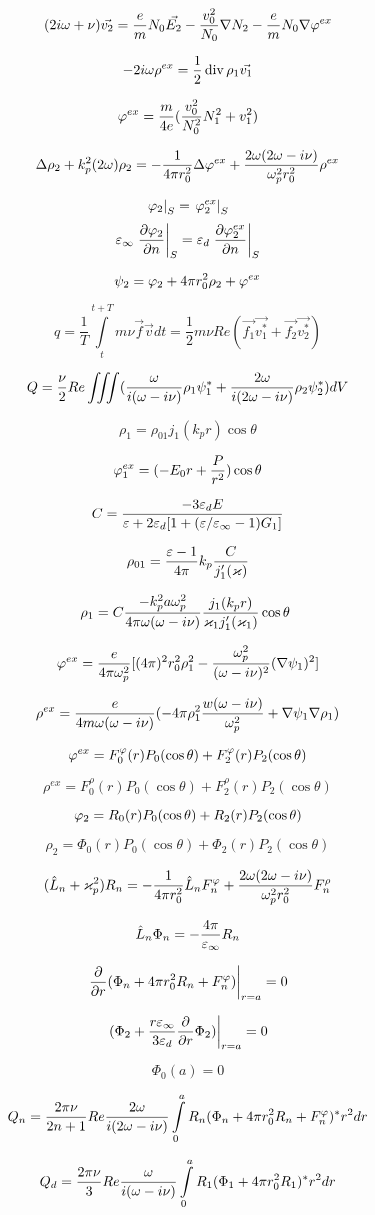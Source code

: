 \documentclass{article}
\begin{document}
\[ (2i\omega + \nu) \vec{v_2} = \frac{e}{m}N_0\vec{E_2} - \frac{v_0^2}{N_0} \nabla N_2 - \frac{e}{m} N_0 \nabla \varphi^{ex}  \]

\[ - 2i\omega \rho^{ex} = \frac{1}{2}\operatorname{div} \rho_1 \vec{v_1}\]

\[ \varphi^{ex} = \frac{m}{4e}(\frac{v_0^2}{N_0^2}N_1^2 + v_1^2)\]

\[ \Delta \rho_2 + k_p^2(2\omega)\rho_2 = -\frac{1}{4 \pi r_0^2} \Delta \varphi^{ex} + \frac{2\omega(2\omega - i \nu)}{\omega_p^2r_0^2} \rho^{ex}\]

\[ \left. \varphi_2 \right|_{ S} = \left. \varphi_2^{ex} \right|_{ S} \]
\[ \varepsilon_\infty \left.\frac{\partial \varphi_2}{\partial n}\right|_{ S} = \varepsilon_d \left.\frac{\partial \varphi_2^{ex}}{\partial n}\right|_{ S}  \]



\[ \psi_2 = \varphi_2 + 4 \pi r_0^2 \rho_2 + \varphi^{ex}\]

\[ q = \frac{1}{T} \int\limits_t^{t+T} m \nu \vec{f} \vec{v} dt = \frac{1}{2} m \nu Re(\vec{f_1} \vec{v_1^*} +\vec{f_2} \vec{v_2^*})\]

\[ Q = \frac{\nu}{2} Re \iiint (\frac{\omega}{i(\omega - i \nu)}\rho_1 \psi_1^* + \frac{2\omega}{i(2\omega - i \nu)}\rho_2 \psi_2^*)dV\]

\[ \rho_1 = \rho_{01}j_1(k_pr)\cos\theta\]

\[ \varphi_1^{ex} = (-E_0r + \frac{P}{r^2})\cos\theta\]

\[ C= \frac{-3\varepsilon_dE}{\varepsilon + 2\varepsilon_d [1 + (\varepsilon/\varepsilon_\infty - 1) G_1]}\]

\[ \rho_{01} = \frac{\varepsilon -1}{4\pi}k_p\frac{C}{j_1' (\varkappa)}\]

\[ \rho_1 = C \frac{-k_p^2a\omega_p^2}{4\pi\omega(\omega - i \nu) } \frac{j_1(k_p r)}{\varkappa_1 j_1' (\varkappa_1)}\cos\theta\ \]

\[ \varphi^{ex} = \frac{e}{4 \pi \omega_p^2}[(4\pi)^2r_0^2\rho_1^2 - \frac{\omega_p^2}{(\omega - i \nu)^2}(\nabla \psi_1)^2] \]

\[ \rho^{ex} = \frac{e}{4 m \omega(\omega - i \nu)}(-4 \pi \rho_1^2 \frac{w(\omega - i \nu)}{\omega_p^2} + \nabla \psi_1\nabla \rho_1)\]

\[ \varphi^{ex} = F_0^\varphi(r)P_0(\cos\theta) + F_2^\varphi(r)P_2(\cos\theta)\]

\[ \rho^{ex} = F_0^\rho(r)P_0(\cos\theta) + F_2^\rho(r)P_2(\cos\theta)\]

\[ \varphi_2 = R_0(r)P_0(\cos\theta) + R_2(r)P_2(\cos\theta)\]

\[ \rho_2 = \Phi_0(r)P_0(\cos\theta) + \Phi_2(r)P_2(\cos\theta)\]

\[ (\hat L_n + \varkappa_p^2) R_n = -\frac{1}{4 \pi r_0^2}\hat L_n F_n^\varphi  + \frac{2\omega(2\omega - i \nu)}{\omega_p^2r_0^2}F_n^\rho \]

\[ \hat L_n \Phi_n = -\frac{4\pi}{\varepsilon_\infty}R_n\]

\[ \left.\frac{\partial }{\partial r} (\Phi_n  + 4\pi r_0^2R_n + F_n^\varphi)\right|_{ r = a} = 0 \]

\[ \left. (\Phi_2  + \frac{r \varepsilon_\infty}{3\varepsilon_d}\frac{\partial }{\partial r}\Phi_2)\right|_{ r = a} = 0 \]

\[ \Phi_0 (a) = 0\]

\[ Q_n = \frac{2\pi\nu}{2n+1}Re \frac{2\omega}{i(2\omega - i \nu)} \int\limits_0^a R_n(\Phi_n  + 4\pi r_0^2R_n + F_n^\varphi)^*r^2dr\]

\[ Q_d = \frac{2\pi\nu}{3}Re \frac{\omega}{i(\omega - i \nu)}\int\limits_0^a R_1(\Phi_1  + 4\pi r_0^2R_1 )^*r^2dr\]

\[ \]
\end{document}
